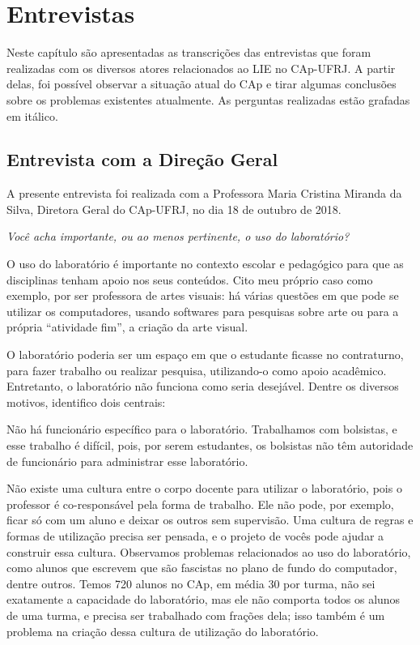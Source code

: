 \chapter{Entrevistas}\label{chp:LABEL_CHP_ENT}

Neste capítulo são apresentadas as transcrições das entrevistas que foram realizadas com os diversos atores relacionados ao LIE no CAp-UFRJ. A partir delas, foi possível observar a situação atual do CAp e tirar algumas conclusões sobre os problemas existentes atualmente. As perguntas realizadas estão grafadas em itálico.

\section{Entrevista com a Direção Geral}\label{chp:LABEL_CHP_ENT_SEC_DG}

A presente entrevista foi realizada com a Professora Maria Cristina Miranda da Silva, Diretora Geral do CAp-UFRJ, no dia 18 de outubro de 2018.

\textit{Você acha importante, ou ao menos pertinente, o uso do laboratório?}

O uso do laboratório é importante no contexto escolar e pedagógico para que as disciplinas tenham apoio nos seus conteúdos. Cito meu próprio caso como exemplo, por ser professora de artes visuais: há várias questões em que pode se utilizar os computadores, usando softwares para pesquisas sobre arte ou para a própria “atividade fim”, a criação da arte visual.

O laboratório poderia ser um espaço em que o estudante ficasse no contraturno, para fazer trabalho ou realizar pesquisa, utilizando-o como apoio acadêmico. Entretanto, o laboratório não funciona como seria desejável. Dentre os diversos motivos, identifico dois centrais:

Não há funcionário específico para o laboratório. Trabalhamos com bolsistas, e esse trabalho é difícil, pois, por serem estudantes, os bolsistas não têm autoridade de funcionário para administrar esse laboratório.

Não existe uma cultura entre o corpo docente para utilizar o laboratório, pois o professor é co-responsável pela forma de trabalho. Ele não pode, por exemplo, ficar só com um aluno e deixar os outros sem supervisão. Uma cultura de regras e formas de utilização precisa ser pensada, e o projeto de vocês pode ajudar a construir essa cultura. Observamos problemas relacionados ao uso do laboratório, como alunos que escrevem que são fascistas no plano de fundo do computador, dentre outros. Temos 720 alunos no CAp, em média 30 por turma, não sei exatamente a capacidade do laboratório, mas ele não comporta todos os alunos de uma turma, e precisa ser trabalhado com frações dela; isso também é um problema na criação dessa cultura de utilização do laboratório.

